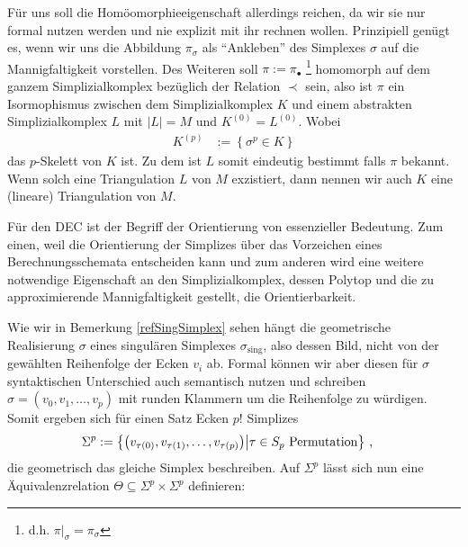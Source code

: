 \begin{bemerkung}
      Für uns soll die Homöomorphieeigenschaft allerdings reichen, da wir sie nur formal nutzen werden und nie explizit mit ihr rechnen wollen.
      Prinzipiell genügt es, wenn wir uns die Abbildung \( \pi_{\sigma} \) als "`Ankleben"' des Simplexes \( \sigma \) auf die Mannigfaltigkeit vorstellen.
      Des Weiteren soll \( \pi:=\pi_{\bullet} \) \footnote{d.h. \( \pi|_{\sigma} = \pi_{\sigma} \)} homomorph auf dem ganzem Simplizialkomplex bezüglich der Relation \( \prec \) sein, 
      also ist \( \pi \) ein Isormophismus zwischen dem Simplizialkomplex \( K \) und einem abstrakten Simplizialkomplex \( L \) mit \( |L| = M \) und \( K^{(0)} = L^{(0)} \).
      Wobei
      \begin{align}
        K^{(p)} &:= \left\{ \sigma^{p} \in K \right\}
      \end{align}
      das \( p \)-Skelett von \( K \) ist. 
      Zu dem ist \( L \) somit eindeutig bestimmt falls \( \pi \) bekannt. 
      Wenn solch eine Triangulation \( L \) von \( M \) exzistiert, dann nennen wir auch \( K \) eine (lineare) Triangulation von \( M \).
    \end{bemerkung}

    Für den DEC ist der Begriff der Orientierung von essenzieller Bedeutung. 
    Zum einen, weil die Orientierung der Simplizes über das Vorzeichen eines Berechnungsschemata entscheiden kann 
    und zum anderen wird eine weitere notwendige Eigenschaft an den Simplizialkomplex, dessen Polytop und die zu approximierende Mannigfaltigkeit gestellt, die Orientierbarkeit.

    Wie wir in Bemerkung \ref{refSingSimplex} sehen hängt die geometrische Realisierung \( \sigma \) eines singulären Simplexes \( \sigma_{\text{sing}} \), 
    also dessen Bild, nicht von der gewählten Reihenfolge der Ecken \( v_{i} \) ab. 
    Formal können wir aber diesen für \( \sigma \) syntaktischen Unterschied auch semantisch nutzen und schreiben \( \sigma = \left( v_{0}, v_{1}, \ldots, v_{p} \right) \)
    mit runden Klammern um die Reihenfolge zu würdigen. 
    Somit ergeben sich für einen Satz Ecken \( p! \) Simplizes 
    \begin{align}
      \Sigma^{p} &:= \left\{ \left( v_{\tau(0)}, v_{\tau(1)}, \ldots, v_{\tau(p)} \right) \middle| \tau\in S_{p} \text{ Permutation} \right\} \,\text{,}
    \end{align}
    die geometrisch das gleiche Simplex beschreiben.
    Auf \( \Sigma^{p} \) lässt sich nun eine Äquivalenzrelation \( \Theta \subseteq \Sigma^{p}\times\Sigma^{p} \) definieren:

